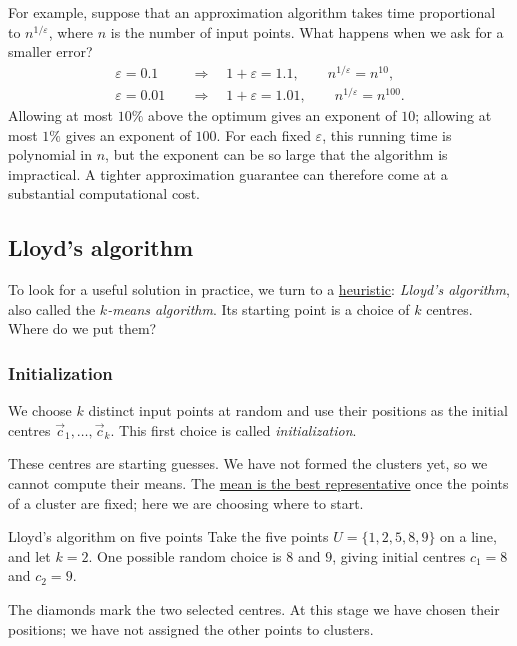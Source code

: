 \documentclass[a4paper,12pt,oneside]{report}
\begin{document}
For example, suppose that an approximation algorithm takes time
proportional to $n^{1/\varepsilon}$, where $n$ is the number of input
points. What happens when we ask for a smaller error?
\[
\begin{aligned}
  \varepsilon=0.1 &\quad\Longrightarrow\quad
    1+\varepsilon=1.1,\qquad n^{1/\varepsilon}=n^{10},\\
  \varepsilon=0.01 &\quad\Longrightarrow\quad
    1+\varepsilon=1.01,\qquad n^{1/\varepsilon}=n^{100}.
\end{aligned}
\]
Allowing at most $10\%$ above the optimum gives an exponent of $10$;
allowing at most $1\%$ gives an exponent of $100$. For each fixed
$\varepsilon$, this running time is polynomial in $n$, but the exponent
can be so large that the algorithm is impractical. A tighter
approximation guarantee can therefore come at a substantial
computational cost.

\subsection{Lloyd's algorithm}
\label{sec:lloyd}

To look for a useful solution in practice, we turn to a
\hyperref[sec:heuristics]{heuristic}: \emph{Lloyd's algorithm}, also
called the \emph{$k$-means algorithm}. Its starting point is a choice
of $k$ centres. Where do we put them?

\subsubsection{Initialization}
\label{sec:lloyd-initialization}

We choose $k$ distinct input points at random and use their positions
as the initial centres $\vec c_1,\ldots,\vec c_k$. This first choice is
called \emph{initialization}.

These centres are starting guesses. We have not formed the clusters
yet, so we cannot compute their means. The
\hyperref[prop:k-means-one]{mean is the best representative} once the
points of a cluster are fixed; here we are choosing where to start.

\begin{framedexample}{Lloyd's algorithm on five points}
\label{ex:lloyd-initialization}
Take the five points $U=\{1,2,5,8,9\}$ on a line, and let $k=2$.
One possible random choice is $8$ and $9$, giving initial centres
$c_1=8$ and $c_2=9$.
\begin{center}
\end{center}
The diamonds mark the two selected centres. At this stage we have
chosen their positions; we have not assigned the other points to
clusters.
\end{framedexample}
\end{document}
